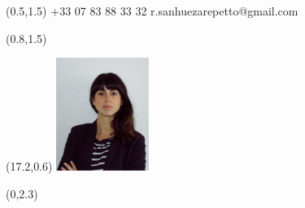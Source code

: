 \documentclass[30pt, french]{tccv}
\begin{document}
\begin{upshape}
\fontsize{9pt}{1em}\color{text}\selectfont



%
%




\begin{textblock}{6.5}(0.5,1.5)
    {+33 07 83 88 33 32}
    {r.sanhuezarepetto@gmail.com}
\end{textblock}

\begin{textblock}{21}(0.8,1.5)
\end{textblock}

\begin{textblock}{21}(17.2,0.6)
		\includegraphics[width=3cm]{../Figure/Rocio3.png}
\end{textblock}  



\begin{textblock}{21}(0,2.3)

\begin{center}
	{\fontsize{20pt}{5em}\scshape\bfseries  \\} 

	\vspace{5pt}
	
	{\fontsize{15pt}{3.5em}\color{text}\bodyfontlight\upshape \\}
\end{center}
\end{textblock}  





%
%





\end{upshape}
\end{document}
